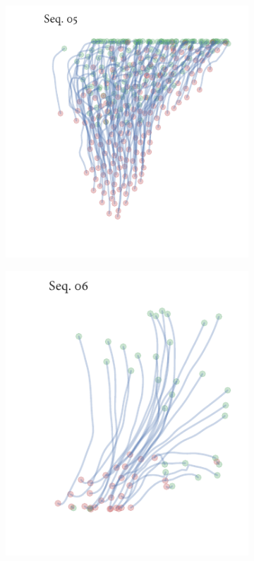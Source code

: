 \begin{figure}[h]
\begin{subfigure}[t]{0.5\textwidth}
		\includegraphics{sequence05.pdf}
	\end{subfigure}%
	\begin{subfigure}[t]{0.5\textwidth}
		\centering
		\includegraphics{sequence06.pdf}
	\end{subfigure}
\end{figure}

